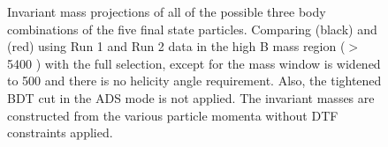 \begin{figure}
\hfill
{}
\caption{Invariant mass projections of all of the possible three body combinations of the five final state particles. Comparing \decay{\Dz}{\Km\pip} (black) and \decay{\Dz}{\Kp\pim} (red) using Run 1 and Run 2 data in the high B mass region ($>$ 5400 \mevcc) with the full selection, except for the \Kstar mass window is widened to 500 \mev and there is no \KS helicity angle requirement. Also, the tightened BDT cut in the ADS mode is not applied. The invariant masses are constructed from the various particle momenta without DTF constraints applied.}
\label{projections3bodynodtf}
\end{figure}

